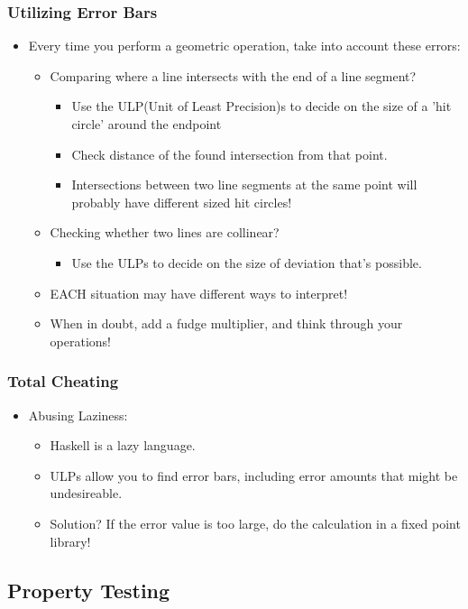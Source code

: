 \documentclass[hyperref={pdfpagemode=FullScreen},aspectratio=169]{beamer}
\begin{document}
\begin{frame}
  \frametitle{Utilizing Error Bars}
  \begin{itemize}
  \item Every time you perform a geometric operation, take into account these errors:
    \begin {itemize}
    \item Comparing where a line intersects with the end of a line segment?
      \begin {itemize}
      \item Use the ULP(Unit of Least Precision)s to decide on the size of a 'hit circle' around the endpoint
      \item Check distance of the found intersection from that point.
      \item Intersections between two line segments at the same point will probably have different sized hit circles!
      \end{itemize}
    \item Checking whether two lines are collinear?
      \begin {itemize}
      \item Use the ULPs to decide on the size of deviation that's possible.
      \end{itemize}
    \item EACH situation may have different ways to interpret!
    \item When in doubt, add a fudge multiplier, and think through your operations!
    \end{itemize}
  \end{itemize}
\end{frame}

\begin{frame}
  \frametitle{Total Cheating}
  \begin{itemize}
  \item Abusing Laziness:
    \begin{itemize}
    \item Haskell is a lazy language.
    \item ULPs allow you to find error bars, including error amounts that might be undesireable.
    \item Solution? If the error value is too large, do the calculation in a fixed point library!
    \end{itemize}
  \end{itemize}
\end{frame}

\subsection{Property Testing}
\end{document}
